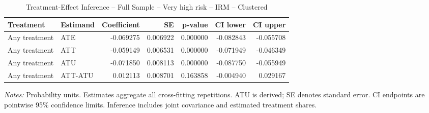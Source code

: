 \begin{table}[htbp]
\centering
\caption{Treatment-Effect Inference -- Full Sample -- Very high risk -- IRM -- Clustered}
\label{tab:inference-VeryHighRiskHome-IRM-clustered}
\scriptsize
\begin{adjustbox}{max width=\linewidth}
\begin{tabular}{llrrrrr}
\toprule
Treatment & Estimand & Coefficient & SE & p-value & CI lower & CI upper \\
\midrule
Any treatment & ATE & -0.069275 & 0.006922 & 0.000000 & -0.082843 & -0.055708 \\
Any treatment & ATT & -0.059149 & 0.006531 & 0.000000 & -0.071949 & -0.046349 \\
Any treatment & ATU & -0.071850 & 0.008113 & 0.000000 & -0.087750 & -0.055949 \\
Any treatment & ATT-ATU & 0.012113 & 0.008701 & 0.163858 & -0.004940 & 0.029167 \\
\bottomrule
\end{tabular}

\end{adjustbox}
\par\smallskip
\begin{minipage}{\linewidth}\scriptsize \textit{Notes:} Probability units. Estimates aggregate all cross-fitting repetitions. ATU is derived; SE denotes standard error. CI endpoints are pointwise 95\% confidence limits. Inference includes joint covariance and estimated treatment shares. \end{minipage}
\end{table}

